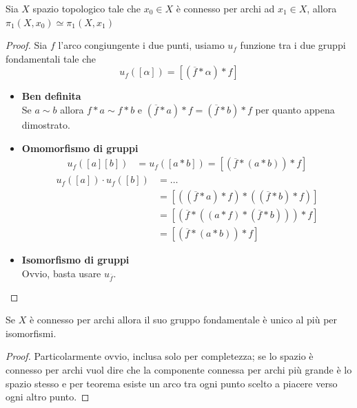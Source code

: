 \begin{theorem}
	Sia $X$ spazio topologico tale che $x_0 \in X$ è connesso per archi ad $x_1 \in X$, allora $\pi_1(X, x_0) \simeq \pi_1(X, x_1)$
\end{theorem}
\begin{proof} Sia $f$ l'arco congiungente i due punti, usiamo $u_f$ funzione tra i due gruppi fondamentali tale che
	\begin{equation*}
	u_f\left([\alpha]\right)=[(\overline{f}*\alpha)*f]
	\end{equation*}
	\begin{itemize}
		\item \textbf{Ben definita}\\
		Se $a \sim b$ allora $f*a \sim f*b$ e $(\overline{f}*a)*f=(\overline{f}*b)*f $ per quanto appena dimostrato.
		\item \textbf{Omomorfismo di gruppi}
		\begin{align*}
		u_f\left([a][b]\right)& =u_f\left([a*b]\right)=\left[\left(\overline{f}*(a*b)\right)*f\right]
		\end{align*}
		\begin{align*}
		u_f([a])\cdot u_f([b]) & = \dots \\
		& = \left[\left((\overline{f}*a)*f\right)*\left((\overline{f}*b)*f\right)\right]\\
		& = \left[\left(\overline{f}*\left((a*f)*(\overline{f}*b)\right)\right)*f\right]\\
		& = \left[\left(\overline{f}*(a*b)\right)*f\right]
		\end{align*}
		\item \textbf{Isomorfismo di gruppi}\\
		Ovvio, basta usare $u_{\overline{f}}$.
	\end{itemize}
\end{proof}

\begin{corollary}
	Se $X$ è connesso per archi allora il suo gruppo fondamentale è unico al più per isomorfismi.
\end{corollary}

\begin{proof} Particolarmente ovvio, inclusa solo per completezza; se lo spazio è connesso per archi vuol dire che la componente connessa per archi più grande è lo spazio stesso e per teorema esiste un arco tra ogni punto scelto a piacere verso ogni altro punto.
\end{proof}	
	
